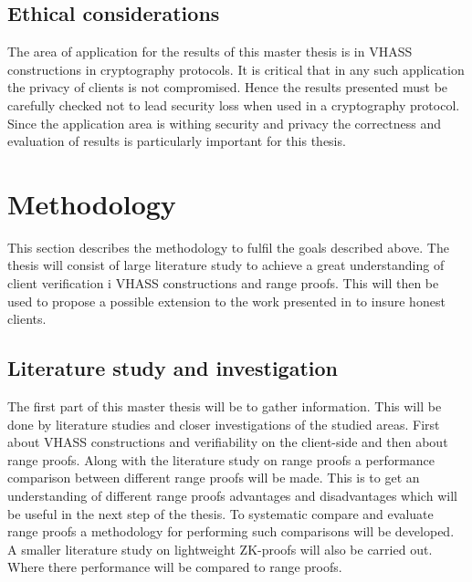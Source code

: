 \documentclass[12pt,a4paper]{article}
\begin{document}


\subsection{Ethical considerations}
The area of application for the results of this master thesis is in VHASS constructions in cryptography protocols. It is critical that in any such application the privacy of clients is not compromised. Hence the results presented must be carefully checked not to lead security loss when used in a cryptography protocol.  Since the application area is withing security and privacy the correctness and evaluation of results is particularly important for this thesis.


\section{Methodology}
This section describes the methodology to fulfil the goals described above. The thesis will consist of large literature study to achieve a great understanding of client verification i VHASS constructions and range proofs. This will then be used to propose a possible extension to the work presented in \cite{Georgia-orginal} to insure honest clients.

\subsection{Literature study and investigation}
The first part of this master thesis will be to gather information. This will be done by literature studies and closer investigations of the studied areas. First about VHASS constructions and verifiability on the client-side and then about range proofs. Along with the literature study on range proofs a performance comparison between different range proofs will be made. This is to get an understanding of different range proofs advantages and disadvantages which will be useful in the next step of the thesis. To systematic compare and evaluate range proofs a methodology for performing such comparisons will be developed. A smaller literature study on lightweight ZK-proofs will also be carried out. Where there performance will be compared to range proofs.
\end{document}
